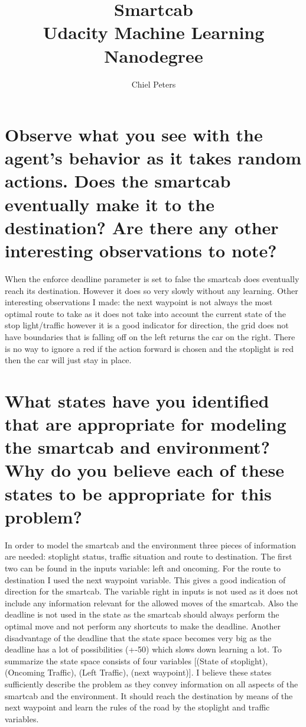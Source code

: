 \documentclass{article}
\begin{document}
\title{Smartcab \\ Udacity Machine Learning Nanodegree}
\author{Chiel Peters}
\maketitle

\section*{Observe what you see with the agent's behavior as it takes random actions. Does the smartcab eventually make it to the destination? Are there any other interesting observations to note?}

When the enforce deadline parameter is set to false the smartcab does eventually reach its destination. However it does so very slowly without any learning. Other interesting observations I made: the next waypoint is not always the most optimal route to take as it does not take into account the current state of the stop light/traffic however it is a good indicator for direction, the grid does not have boundaries that is falling off on the left returns the car on the right. There is no way to ignore a red if the action forward is chosen and the stoplight is red then the car will just stay in place.

\section*{What states have you identified that are appropriate for modeling the smartcab and environment? Why do you believe each of these states to be appropriate for this problem?}

In order to model the smartcab and the environment three pieces of information are needed: stoplight status, traffic situation and route to destination. The first two can be found in the inputs variable: left and oncoming. For the route to destination I used the next waypoint variable. This gives a good indication of direction for the smartcab. The variable right in inputs is not used as it does not include any information relevant for the allowed moves of the smartcab. Also the deadline is not used in the state as the smartcab should always perform the optimal move and not perform any shortcuts to make the deadline. Another disadvantage of the deadline that the state space becomes very big as the deadline has a lot of possibilities (+-50) which slows down learning a lot. 
To summarize the state space consists of four variables [(State of stoplight),(Oncoming Traffic), (Left Traffic), (next waypoint)]. I believe these states sufficiently describe the problem as they convey information on all aspects of the smartcab and the environment. It should reach the destination by means of the next waypoint and learn the rules of the road by the stoplight and traffic variables. 
\end{document}
